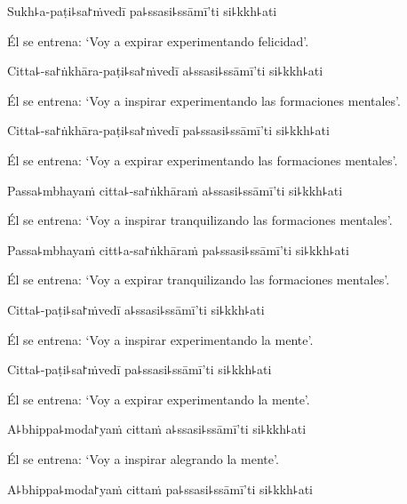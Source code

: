 Sukh꜕a-paṭi꜕sa꜓ṁvedī pa꜕ssasi꜕ssāmī'ti si꜕kkh꜕ati

\begin{english}
  Él se entrena: `Voy a expirar experimentando felicidad'.
\end{english}

Citta꜕-sa꜓ṅkhāra-paṭi꜕sa꜓ṁvedī a꜕ssasi꜕ssāmī'ti si꜕kkh꜕ati

\begin{english}
  Él se entrena: `Voy a inspirar experimentando las formaciones mentales'.
\end{english}

Citta꜕-sa꜓ṅkhāra-paṭi꜕sa꜓ṁvedī pa꜕ssasi꜕ssāmī'ti si꜕kkh꜕ati

\begin{english}
  Él se entrena: `Voy a expirar experimentando las formaciones mentales'.
\end{english}

Passa꜕mbhayaṁ citta꜕-sa꜓ṅkhāraṁ a꜕ssasi꜕ssāmī'ti si꜕kkh꜕ati

\begin{english}
  Él se entrena: `Voy a inspirar tranquilizando las formaciones mentales'.
\end{english}

Passa꜕mbhayaṁ citt꜕a-sa꜓ṅkhāraṁ pa꜕ssasi꜕ssāmī'ti si꜕kkh꜕ati

\begin{english}
  Él se entrena: `Voy a expirar tranquilizando las formaciones mentales'.
\end{english}

Citta꜕-paṭi꜕sa꜓ṁvedī a꜕ssasi꜕ssāmī'ti si꜕kkh꜕ati

\begin{english}
  Él se entrena: `Voy a inspirar experimentando la mente'.
\end{english}

Citta꜕-paṭi꜕sa꜓ṁvedī pa꜕ssasi꜕ssāmī'ti si꜕kkh꜕ati

\begin{english}
  Él se entrena: `Voy a expirar experimentando la mente'.
\end{english}

A꜕bhippa꜕moda꜓yaṁ cittaṁ a꜕ssasi꜕ssāmī'ti si꜕kkh꜕ati

\begin{english}
  Él se entrena: `Voy a inspirar alegrando la mente'.
\end{english}

A꜕bhippa꜕moda꜓yaṁ cittaṁ pa꜕ssasi꜕ssāmī'ti si꜕kkh꜕ati

